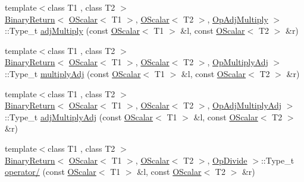 \begin{DoxyCompactItemize}
\item 
{\footnotesize template$<$class T1 , class T2 $>$ }\\\mbox{\hyperlink{structENSEM_1_1BinaryReturn}{Binary\+Return}}$<$ \mbox{\hyperlink{classENSEM_1_1OScalar}{O\+Scalar}}$<$ T1 $>$, \mbox{\hyperlink{classENSEM_1_1OScalar}{O\+Scalar}}$<$ T2 $>$, \mbox{\hyperlink{structENSEM_1_1OpAdjMultiply}{Op\+Adj\+Multiply}} $>$\+::Type\+\_\+t \mbox{\hyperlink{group__obsscalar_ga98359922a5222cb069e48d5b6916390e}{adj\+Multiply}} (const \mbox{\hyperlink{classENSEM_1_1OScalar}{O\+Scalar}}$<$ T1 $>$ \&l, const \mbox{\hyperlink{classENSEM_1_1OScalar}{O\+Scalar}}$<$ T2 $>$ \&r)
\item 
{\footnotesize template$<$class T1 , class T2 $>$ }\\\mbox{\hyperlink{structENSEM_1_1BinaryReturn}{Binary\+Return}}$<$ \mbox{\hyperlink{classENSEM_1_1OScalar}{O\+Scalar}}$<$ T1 $>$, \mbox{\hyperlink{classENSEM_1_1OScalar}{O\+Scalar}}$<$ T2 $>$, \mbox{\hyperlink{structENSEM_1_1OpMultiplyAdj}{Op\+Multiply\+Adj}} $>$\+::Type\+\_\+t \mbox{\hyperlink{group__obsscalar_ga0549c309e400fa9b2c660bdec29e7f91}{multiply\+Adj}} (const \mbox{\hyperlink{classENSEM_1_1OScalar}{O\+Scalar}}$<$ T1 $>$ \&l, const \mbox{\hyperlink{classENSEM_1_1OScalar}{O\+Scalar}}$<$ T2 $>$ \&r)
\item 
{\footnotesize template$<$class T1 , class T2 $>$ }\\\mbox{\hyperlink{structENSEM_1_1BinaryReturn}{Binary\+Return}}$<$ \mbox{\hyperlink{classENSEM_1_1OScalar}{O\+Scalar}}$<$ T1 $>$, \mbox{\hyperlink{classENSEM_1_1OScalar}{O\+Scalar}}$<$ T2 $>$, \mbox{\hyperlink{structENSEM_1_1OpAdjMultiplyAdj}{Op\+Adj\+Multiply\+Adj}} $>$\+::Type\+\_\+t \mbox{\hyperlink{group__obsscalar_ga53406445c0fa210f9ed3a41ab077b31e}{adj\+Multiply\+Adj}} (const \mbox{\hyperlink{classENSEM_1_1OScalar}{O\+Scalar}}$<$ T1 $>$ \&l, const \mbox{\hyperlink{classENSEM_1_1OScalar}{O\+Scalar}}$<$ T2 $>$ \&r)
\item 
{\footnotesize template$<$class T1 , class T2 $>$ }\\\mbox{\hyperlink{structENSEM_1_1BinaryReturn}{Binary\+Return}}$<$ \mbox{\hyperlink{classENSEM_1_1OScalar}{O\+Scalar}}$<$ T1 $>$, \mbox{\hyperlink{classENSEM_1_1OScalar}{O\+Scalar}}$<$ T2 $>$, \mbox{\hyperlink{structENSEM_1_1OpDivide}{Op\+Divide}} $>$\+::Type\+\_\+t \mbox{\hyperlink{group__obsscalar_gadc02b34a3b7610b73a4ab6d413f19c17}{operator/}} (const \mbox{\hyperlink{classENSEM_1_1OScalar}{O\+Scalar}}$<$ T1 $>$ \&l, const \mbox{\hyperlink{classENSEM_1_1OScalar}{O\+Scalar}}$<$ T2 $>$ \&r)

\end{DoxyCompactItemize}
